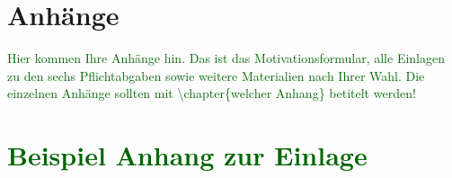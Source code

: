 \documentclass[pdftex,12pt,twoside,footsepline,headsepline,a4paper,final]{scrreprt}
\begin{document}


\appendix

\chapter*{Anh\"{a}nge}



\textcolor{darkgreen}{Hier kommen Ihre Anh\"{a}nge hin. Das ist das Motivationsformular, alle Einlagen zu den sechs Pflichtabgaben sowie weitere Materialien nach Ihrer Wahl. Die einzelnen Anh\"{a}nge sollten mit \textbackslash chapter\{welcher Anhang\} betitelt werden!}


\chapter{\textcolor{darkgreen}{Beispiel Anhang zur Einlage}}
\end{document}
